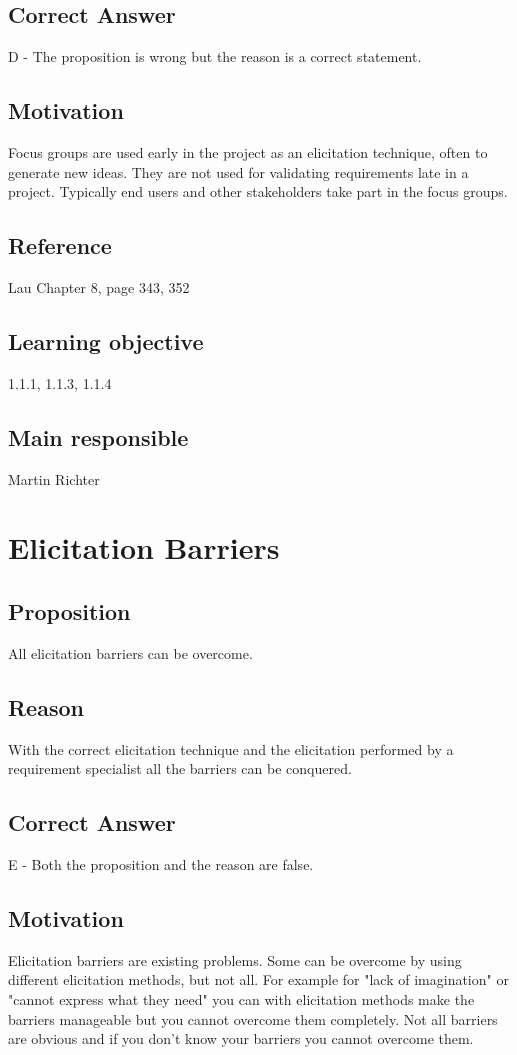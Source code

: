 \documentclass[a4paper]{article}
\begin{document}
\subsection*{Correct Answer}
D - The proposition is wrong but the reason is a correct statement.
\subsection*{Motivation}
Focus groups are used early in the project as an elicitation technique, often to generate new ideas. They are not used for validating requirements late in a project. Typically end users and other stakeholders take part in the focus groups.
\subsection*{Reference}
Lau Chapter 8, page 343, 352
\subsection*{Learning objective}
1.1.1, 1.1.3, 1.1.4
\subsection*{Main responsible}
Martin Richter


\section{Elicitation Barriers}
\subsection*{Proposition}
All elicitation barriers can be overcome.
\subsection*{Reason}
With the correct elicitation technique and the elicitation performed by a requirement specialist all the barriers can be conquered.
\subsection*{Correct Answer}
E - Both the proposition and the reason are false.
\subsection*{Motivation}
Elicitation barriers are existing problems. Some can be overcome by using different elicitation methods, but not all. For example for "lack of imagination" or "cannot express what they need" you can with elicitation methods make the barriers manageable but you cannot overcome them completely. Not all barriers are obvious and if you don't know your barriers you cannot overcome them.
\end{document}
